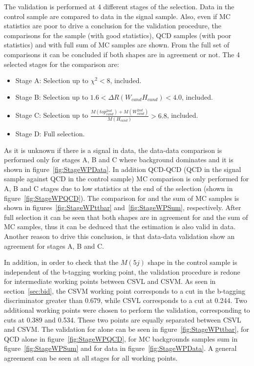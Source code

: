 The validation is performed at 4 different stages of the selection. Data in the control sample are compared to data in the signal sample. Also, even if MC statistics are poor to drive a conclusion for the validation procedure, the comparisons for the \ttbar sample (with good statistics), QCD samples (with poor statistics) and with full sum of MC samples are shown. From the full set of comparisons it can be concluded if both shapes are in agreement or not. The 4 selected stages for the comparison are:
\begin{itemize}
\item Stage A: Selection up to $\chi^{2}<8$, included.
\item Stage B: Selection up to $1.6<\Delta R (W_{cand} H_{cand})<4.0$, included.
\item Stage C: Selection up to $\frac{M(top^{2nd}_{cand})+M(W^{2nd}_{cand})}{M(H_{cand})}>6.8$, included.
\item Stage D: Full selection.
\end{itemize}

As it is unknown if there is a signal in data, the data-data comparison is performed only for stages A, B and C where background dominates and it is shown in figure~\ref{fig:StageWPData}. In addition QCD-QCD (QCD in the signal sample against QCD in the control sample) MC comparison is only performed for A, B and C stages due to low statistics at the end of the selection (shown in figure~\ref{fig:StageWPQCD}). The comparison for \ttbar and the sum of MC samples is shown in figures~\ref{fig:StageWPttbar} and~\ref{fig:StageWPSum}, respectively. After full selection it can be seen that both shapes are in agreement for \ttbar and the sum of MC samples, thus it can be deduced that the estimation is also valid in data. Another reason to drive this conclusion, is that data-data validation show an agreement for stages A, B and C.

In addition, in order to check that the $M(5j)$ shape in the control sample is independent of the b-tagging working point, the validation procedure is redone for intermediate working points between CSVL and CSVM. As seen in section~\ref{sec:bid}, the CSVM working point corresponds to a cut in the b-tagging discriminator greater than 0.679, while CSVL corresponds to a cut at 0.244. Two additional working points were chosen to perform the validation, corresponding to cuts at 0.389 and 0.534. These two points are equally separated between CSVL and CSVM. The validation for \ttbar alone can be seen in figure~\ref{fig:StageWPttbar}, for QCD alone in figure~\ref{fig:StageWPQCD}, for MC backgrounds samples sum in figure~\ref{fig:StageWPSum} and for data in figure~\ref{fig:StageWPData}. A general agreement can be seen at all stages for all working points.

